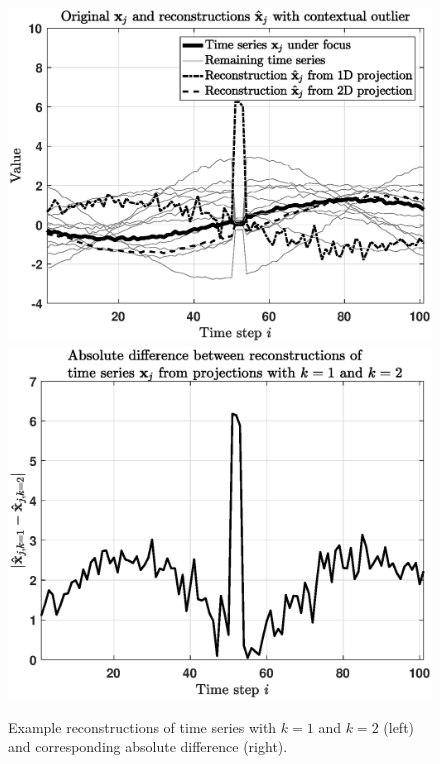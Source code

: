 \begin{figure}[h]
	\centering
	\vspace{0.15cm}
	\includegraphics[scale=0.36]{analysis/Analysis_deltarp_original_reconstructions}
	\includegraphics[scale=0.36]{analysis/Analysis_deltarp_diffreconstructions}
	\caption{Example reconstructions of time series with $k=1$ and $k=2$ (left) and corresponding absolute difference (right).}
	\label{fig:analysis_example_reconstructions}
	\vspace{0.15cm}
\end{figure}

